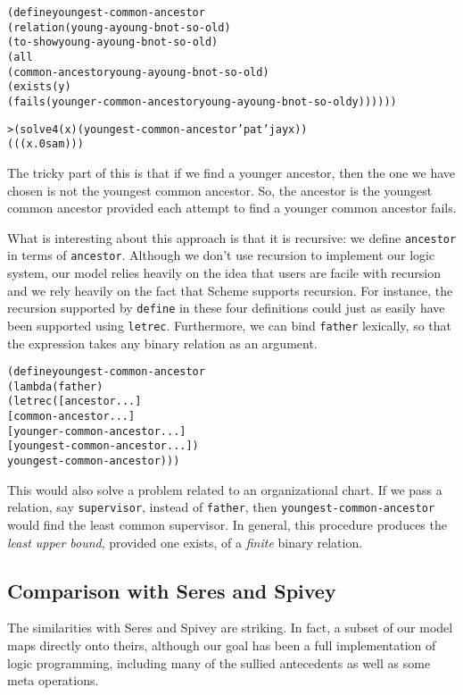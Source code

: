 \begin{alltt}
(define youngest-common-ancestor
  (relation (young-a young-b not-so-old)
    (to-show young-a young-b not-so-old)
    (all
      (common-ancestor young-a young-b not-so-old)
      (exists (y)
        (fails (younger-common-ancestor young-a young-b not-so-old y))))))

> (solve 4 (x) (youngest-common-ancestor 'pat 'jay x))
(((x.0 sam)))
\end{alltt}

\noindent
The tricky part of this is that if we find a younger ancestor,
then the one we have chosen is not the youngest common ancestor.  So, the
ancestor is the youngest common ancestor provided each attempt to find
a younger common ancestor fails.

What is interesting about this approach is that it is recursive: we
define \texttt{ancestor} in terms of \texttt{ancestor}.  Although
we don't use recursion to implement our logic system, our model
relies heavily on the idea that users are facile with recursion
and we rely heavily on the fact that Scheme supports recursion.  For
instance, the recursion supported by \texttt{define} in these four
definitions could just as easily have been supported using
\texttt{letrec}.  Furthermore, we can bind \texttt{father} lexically,
so that the expression takes any binary relation as an argument.

\begin{alltt}
(define youngest-common-ancestor
  (lambda (father)
    (letrec ([ancestor ...]
             [common-ancestor ...]
             [younger-common-ancestor ...]
             [youngest-common-ancestor ...])
      youngest-common-ancestor)))
\end{alltt}

\noindent
This would also solve a problem related to an organizational chart.
If we pass a relation, say \texttt{supervisor}, instead of
\texttt{father}, then \texttt{youngest-common-ancestor} would find the
least common supervisor.  In general, this procedure produces the
\emph{least upper bound}, provided one exists, of a \emph{finite}
binary relation.

\subsection{Comparison with Seres and Spivey}
The similarities with Seres and Spivey are striking.  In fact, a
subset of our model maps directly onto theirs, although our goal
has been a full implementation of logic programming, including
many of the sullied antecedents as well as some meta operations.

